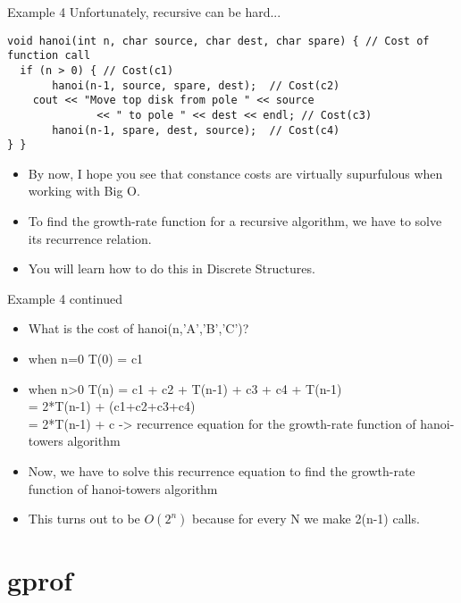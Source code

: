 \documentclass{beamer}
\begin{document}
\begin{frame}[fragile]{Example 4}
Unfortunately, recursive can be hard...
\begin{lstlisting}
void hanoi(int n, char source, char dest, char spare) { // Cost of function call
  if (n > 0) { // Cost(c1)
       hanoi(n-1, source, spare, dest);  // Cost(c2)
    cout << "Move top disk from pole " << source
              << " to pole " << dest << endl; // Cost(c3)
       hanoi(n-1, spare, dest, source);  // Cost(c4)
} }
\end{lstlisting}
\begin{itemize}
\item By now, I hope you see that constance costs are virtually supurfulous when working with Big O.
\item To find the growth-rate function for a recursive algorithm, we have to solve its recurrence relation.
\item You will learn how to do this in Discrete Structures.
\end{itemize}
\end{frame}

\begin{frame}{Example 4 continued}
\begin{itemize}
\item What is the cost of hanoi(n,'A','B','C')?
\item when n=0
      T(0) = c1 
\item when n>0
      T(n) = c1 + c2 + T(n-1) + c3 + c4 + T(n-1) \\
           = 2*T(n-1) + (c1+c2+c3+c4) \\
           = 2*T(n-1) + c   -> recurrence equation for the growth-rate function of hanoi-towers algorithm  \\
\item Now, we have to solve this recurrence equation to find the growth-rate function of hanoi-towers algorithm
\item This turns out to be $O(2^n)$ because for every N we make 2(n-1) calls.
\end{itemize}
\end{frame}


\section{gprof}
\end{document}
